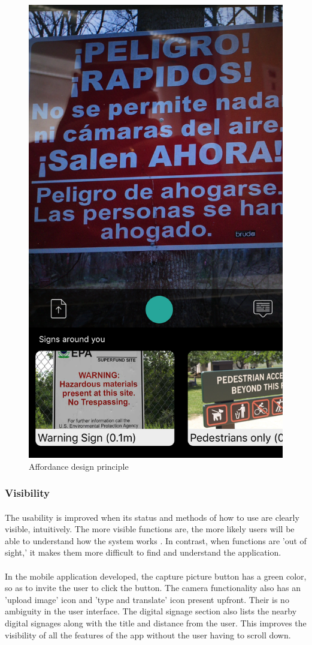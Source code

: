 \documentclass[12pt]{article}
\begin{document}
    
    \begin{figure}[H]
	\centering
	\includegraphics[width=0.5\linewidth]{media/1a.PNG}
	\caption{Affordance design principle}
	\label{fig:affordance}
\end{figure} 

    
    
     \subsubsection{Visibility}
     \paragraph{}The usability is improved when its status and methods of how to use are clearly visible, intuitively. The more visible functions are, the more likely users will be able to understand how the system works \cite{norman}. In contrast, when functions are 'out of sight,' it makes them more difficult to find and understand the application.
     
         \paragraph{} In the mobile application developed, the capture picture button has a green color, so as to invite the user to click the button. The camera functionality also has an 'upload image' icon and 'type and translate' icon present upfront. Their is no ambiguity in the user interface. The digital signage section also lists the nearby digital signages along with the title and distance from the user. This improves the visibility of all the features of the app without the user having to scroll down. 
     
\end{document}

